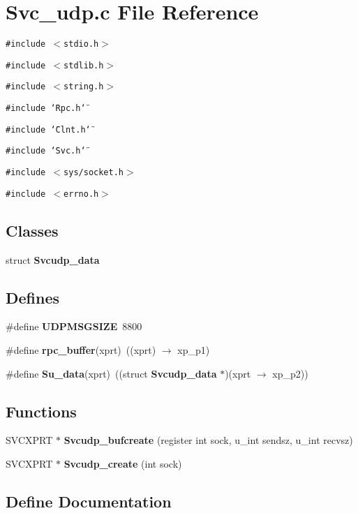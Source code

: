 \section{Svc\_\-udp.c File Reference}
\label{Svc__udp_8c}
{\tt \#include $<$stdio.h$>$}\par
{\tt \#include $<$stdlib.h$>$}\par
{\tt \#include $<$string.h$>$}\par
{\tt \#include \char`\"{}Rpc.h\char`\"{}}\par
{\tt \#include \char`\"{}Clnt.h\char`\"{}}\par
{\tt \#include \char`\"{}Svc.h\char`\"{}}\par
{\tt \#include $<$sys/socket.h$>$}\par
{\tt \#include $<$errno.h$>$}\par
\subsection*{Classes}
\begin{CompactItemize}
\item 
struct {\bf Svcudp\_\-data}
\end{CompactItemize}
\subsection*{Defines}
\begin{CompactItemize}
\item 
\#define {\bf UDPMSGSIZE}\ 8800
\item 
\#define {\bf rpc\_\-buffer}(xprt)\ ((xprt) $\rightarrow$ xp\_\-p1)
\item 
\#define {\bf Su\_\-data}(xprt)\ ((struct {\bf Svcudp\_\-data} $\ast$)(xprt $\rightarrow$ xp\_\-p2))
\end{CompactItemize}
\subsection*{Functions}
\begin{CompactItemize}
\item 
SVCXPRT $\ast$ {\bf Svcudp\_\-bufcreate} (register int sock, u\_\-int sendsz, u\_\-int recvsz)
\item 
SVCXPRT $\ast$ {\bf Svcudp\_\-create} (int sock)
\end{CompactItemize}


\subsection{Define Documentation}
